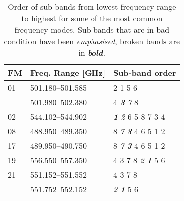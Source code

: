 \begin{table}[tbhp]
  \centering
  \caption{Order of sub-bands from lowest frequency range to highest for some
    of the most common frequency modes. Sub-bands that are in bad condition
    have been \emph{emphasised}, broken bands are in \emph{\textbf{bold}.}
    }\label{table:subbandorder}
  \begin{tabular}{lll}
    \toprule
    \textbf{FM} & \textbf{Freq. Range [GHz]} & \textbf{Sub-band order} \\
    \midrule
    01          & 501.180--501.585           & 2 1 5 6 \\
                & 501.980--502.380           & 4 \emph{\textbf{3} 7} 8 \\
    \midrule
    02          & 544.102--544.902           & \emph{\textbf{1} 2} 6 5 8 7 3 4 \\
    \midrule
    08          & 488.950--489.350           & 8 \emph{7 \textbf{3}} 4 6 5 1 2 \\
    \midrule
    17          & 489.950--490.750           & 8 \emph{7 \textbf{3}} 4 6 5 1 2 \\
    \midrule
    19          & 556.550--557.350           & 4 3 7 8 \emph{2 \textbf{1}} 5 6 \\
    \midrule
    21          & 551.152--551.552           & 4 3 7 8 \\
                & 551.752--552.152           & \emph{2 \textbf{1}} 5 6 \\
    \bottomrule
  \end{tabular}
\end{table}
